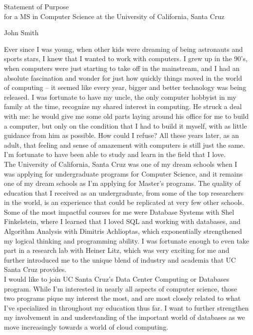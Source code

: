 \documentclass[11pt]{article}
\begin{document}
\begin{center}
    \huge Statement of Purpose \\
    \huge for a MS in Computer Science at the University of California, Santa Cruz \\
    
    \vspace{.75em}
    
    \Large John Smith
\end{center}

Ever since I was young, when other kids were dreaming of being astronauts and sports stars, I knew that I wanted to work with computers. I grew up in the 90's, when computers were just starting to take off in the mainstream, and I had an absolute fascination and wonder for just how quickly things moved in the world of computing -- it seemed like every year, bigger and better technology was being released. I was fortunate to have my uncle, the only computer hobbyist in my family at the time, recognize my shared interest in computing. He struck a deal with me: he would give me some old parts laying around his office for me to build a computer, but only on the condition that I had to build it myself, with as little guidance from him as possible. How could I refuse? All these years later, as an adult, that feeling and sense of amazement with computers is still just the same. I'm fortunate to have been able to study and learn in the field that I love.\\

The University of California, Santa Cruz was one of my dream schools when I was applying for undergraduate programs for Computer Science, and it remains one of my dream schools as I'm applying for Master's programs. The quality of education that I received as an undergraduate, from some of the top researchers in the world, is an experience that could be replicated at very few other schools. Some of the most impactful courses for me were Database Systems with Shel Finkelstein, where I learned that I loved SQL and working with databases, and Algorithm Analysis with Dimitris Achlioptas, which exponentially strengthened my logical thinking and programming ability. I was fortunate enough to even take part in a research lab with Heiner Litz, which was very exciting for me and further introduced me to the unique blend of industry and academia that UC Santa Cruz provides.\\

I would like to join UC Santa Cruz's Data Center Computing or Databases program. While I'm interested in nearly all aspects of computer science, those two programs pique my interest the most, and are most closely related to what I've specialized in throughout my education thus far. I want to further strengthen my involvement in and understanding of the important world of databases as we move increasingly towards a world of cloud computing. \\
\end{document}
